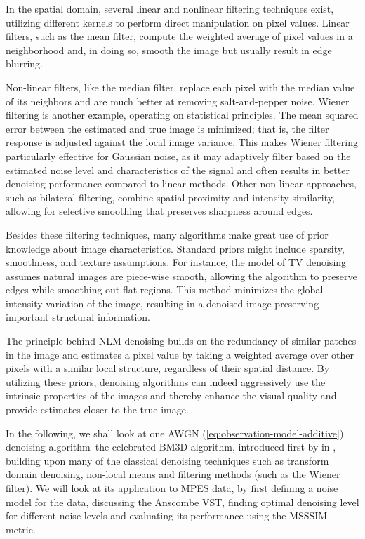 In the spatial domain, several linear and nonlinear filtering techniques exist, utilizing different kernels to perform direct manipulation on pixel values. Linear filters, such as the mean filter, compute the weighted average of pixel values in a neighborhood and, in doing so, smooth the image but usually result in edge blurring.

Non-linear filters, like the median filter, replace each pixel with the median value of its neighbors and are much better at removing salt-and-pepper noise. Wiener filtering is another example, operating on statistical principles. The mean squared error between the estimated and true image is minimized; that is, the filter response is adjusted against the local image variance. This makes Wiener filtering particularly effective for Gaussian noise, as it may adaptively filter based on the estimated noise level and characteristics of the signal and often results in better denoising performance compared to linear methods. Other non-linear approaches, such as bilateral filtering, combine spatial proximity and intensity similarity, allowing for selective smoothing that  preserves sharpness around edges. 

Besides these filtering techniques, many algorithms make great use of prior knowledge about image characteristics. Standard priors might include sparsity, smoothness, and texture assumptions. For instance, the model of TV denoising assumes natural images are piece-wise smooth, allowing the algorithm to preserve edges while smoothing out flat regions. This method minimizes the global intensity variation of the image, resulting in a denoised image preserving important structural information.

The principle behind \gls{NLM}  denoising builds on the redundancy of similar patches in the image and estimates a pixel value by taking a weighted average over other pixels with a similar local structure, regardless of their spatial distance. By utilizing these priors, denoising algorithms can indeed aggressively use the intrinsic properties of the images and thereby enhance the visual quality and provide estimates closer to the true image.

In the following, we shall look at one \gls{AWGN} (\cref{eq:observation-model-additive}) denoising algorithm--the celebrated \gls{BM3D} algorithm, introduced first by \citeauthor{dabovImageDenoisingSparse2007} in \cite{dabovImageDenoisingSparse2007}, building upon many of the classical denoising techniques such as transform domain denoising, non-local means and filtering methods (such as the Wiener filter). We will look at its application to \gls{MPES} data, by first defining a noise model for the data, discussing the Anscombe \gls{VST}, finding optimal denoising level for different noise levels and evaluating its performance using the \gls{MSSSIM} metric.

